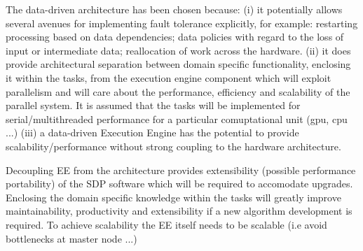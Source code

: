 \documentclass[11pt,a4paper]{article}
\begin{document}
The data-driven architecture has been chosen because: (i) it potentially allows several avenues for implementing fault tolerance explicitly, for example: restarting processing based on data dependencies; data policies with regard to the loss of input or intermediate data; reallocation of work across the hardware. (ii) it does provide architectural separation between domain specific functionality, enclosing
it within the tasks, from the execution engine component which will exploit parallelism and will care about the performance,
efficiency and scalability of the parallel system. It is assumed that the tasks will be implemented for serial/multithreaded performance for a 
particular comuptational unit (gpu, cpu ...) (iii) a data-driven Execution Engine has the potential to provide scalability/performance without strong coupling
to the hardware architecture.

Decoupling EE from the architecture provides extensibility (possible performance portability) of the SDP software which will be required to accomodate upgrades. Enclosing the domain specific knowledge within the tasks will greatly improve maintainability, productivity and extensibility if a new algorithm development is required. To achieve scalability the EE itself needs to be scalable (i.e avoid bottlenecks at master node ...)
\end{document}
